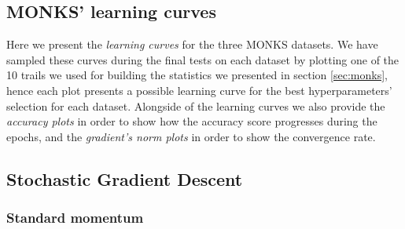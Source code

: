 \begin{appendices}
    \chapter{MONKS' learning curves} %
    \label{cha:monks_learning_curves}
        Here we present the \textit{learning curves} for the three MONKS datasets. We have sampled these curves
        during the final tests on each dataset by plotting one of the 10 trails we used for building the
        statistics we presented in section \ref{sec:monks}, hence each plot presents a possible learning curve
        for the best hyperparameters' selection for each dataset. Alongside of the learning curves
        we also provide the \textit{accuracy plots} in order to show how the accuracy score progresses
        during the epochs, and the \textit{gradient's norm plots} in order to show the convergence
        rate.


        \section{Stochastic Gradient Descent} %
        \label{sec:stochastic_gradient_descent}
            \subsection{Standard momentum} %
            \label{sub:standard_momentum}


\end{appendices}
